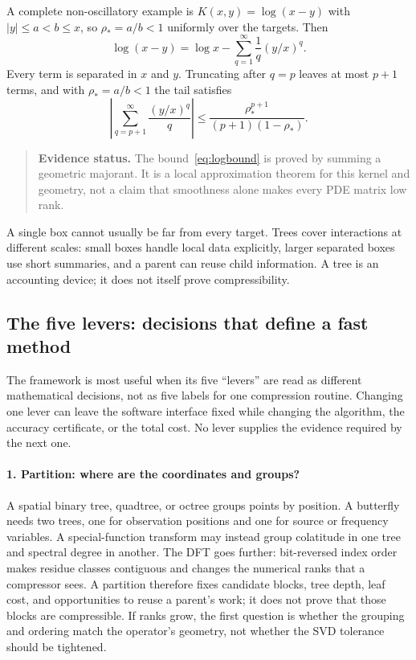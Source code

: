 \documentclass[11pt,a4paper]{article}
\newenvironment{evidence}{\begin{quote}\small\color{muted}\textbf{Evidence status.} }{\end{quote}}
\begin{document}
A complete non-oscillatory example is $K(x,y)=\log(x-y)$ with $|y|\le a<b\le x$, so $\rho_*=a/b<1$ uniformly over the targets. Then
\begin{equation}
 \log(x-y)=\log x-\sum_{q=1}^{\infty}\frac1q(y/x)^q.
 \label{eq:logseries}
\end{equation}
Every term is separated in $x$ and $y$. Truncating after $q=p$ leaves at most $p+1$ terms, and with $\rho_*=a/b<1$ the tail satisfies
\begin{equation}
 \left|\sum_{q=p+1}^{\infty}\frac{(y/x)^q}{q}\right|
 \le\frac{\rho_*^{p+1}}{(p+1)(1-\rho_*)}.
 \label{eq:logbound}
\end{equation}
\begin{evidence}
The bound~\eqref{eq:logbound} is proved by summing a geometric majorant. It is a local approximation theorem for this kernel and geometry, not a claim that smoothness alone makes every PDE matrix low rank.
\end{evidence}

A single box cannot usually be far from every target. Trees cover interactions at different scales: small boxes handle local data explicitly, larger separated boxes use short summaries, and a parent can reuse child information. A tree is an accounting device; it does not itself prove compressibility.

\subsection{The five levers: decisions that define a fast method}
\label{sec:dials}

The framework is most useful when its five ``levers'' are read as different mathematical decisions, not as five labels for one compression routine. Changing one lever can leave the software interface fixed while changing the algorithm, the accuracy certificate, or the total cost. No lever supplies the evidence required by the next one.

\paragraph{1. Partition: where are the coordinates and groups?}
A spatial binary tree, quadtree, or octree groups points by position. A butterfly needs two trees, one for observation positions and one for source or frequency variables. A special-function transform may instead group colatitude in one tree and spectral degree in another. The DFT goes further: bit-reversed index order makes residue classes contiguous and changes the numerical ranks that a compressor sees. A partition therefore fixes candidate blocks, tree depth, leaf cost, and opportunities to reuse a parent's work; it does not prove that those blocks are compressible. If ranks grow, the first question is whether the grouping and ordering match the operator's geometry, not whether the SVD tolerance should be tightened.
\end{document}
